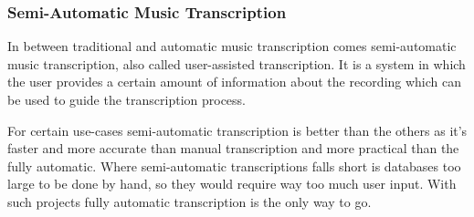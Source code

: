 \subsubsection{Semi-Automatic Music Transcription}
In between traditional and automatic music transcription comes semi-automatic music transcription, also called user-assisted transcription. It is a system in which the user provides a certain amount of information about the recording which can be used to guide the transcription process. \cite{semi-automatic}
\par

For certain use-cases semi-automatic transcription is better than the others as it's faster and more accurate than manual transcription and more practical than the fully automatic. Where semi-automatic transcriptions falls short is databases too large to be done by hand, so they would require way too much user input. With such projects fully automatic transcription is the only way to go.